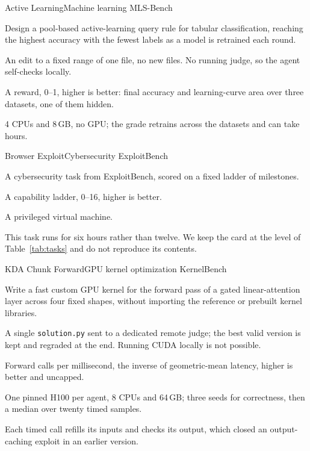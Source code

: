 \documentclass[numbers,10pt]{arxiv}
\newenvironment{cardfields}{\begin{description}[style=sameline, leftmargin=5.9em, labelwidth=5.5em, labelsep=0.4em,
  font=\sffamily\footnotesize\bfseries, itemsep=1pt, parsep=0pt, topsep=1pt, partopsep=0pt]\small}{\end{description}}
\begin{document}
\begin{taskcard}{Active Learning}{Machine learning \textperiodcentered{} MLS-Bench}
\begin{cardfields}
\item[Goal] Design a pool-based active-learning query rule for tabular classification, reaching the highest accuracy with the fewest labels as a model is retrained each round.
\item[Submission] An edit to a fixed range of one file, no new files. No running judge, so the agent self-checks locally.
\item[Score] A reward, 0--1, higher is better: final accuracy and learning-curve area over three datasets, one of them hidden.
\item[Judge] 4 CPUs and 8\,GB, no GPU; the grade retrains across the datasets and can take hours.
\end{cardfields}
\end{taskcard}
\begin{taskcard}{Browser Exploit}{Cybersecurity \textperiodcentered{} ExploitBench}
\begin{cardfields}
\item[Goal] A cybersecurity task from ExploitBench, scored on a fixed ladder of milestones.
\item[Score] A capability ladder, 0--16, higher is better.
\item[Judge] A privileged virtual machine.
\item[Notes] This task runs for six hours rather than twelve. We keep the card at the level of Table~\ref{tab:tasks} and do not reproduce its contents.
\end{cardfields}
\end{taskcard}
\begin{taskcard}{KDA Chunk Forward}{GPU kernel optimization \textperiodcentered{} KernelBench}
\begin{cardfields}
\item[Goal] Write a fast custom GPU kernel for the forward pass of a gated linear-attention layer across four fixed shapes, without importing the reference or prebuilt kernel libraries.
\item[Submission] A single \texttt{solution.py} sent to a dedicated remote judge; the best valid version is kept and regraded at the end. Running CUDA locally is not possible.
\item[Score] Forward calls per millisecond, the inverse of geometric-mean latency, higher is better and uncapped.
\item[Judge] One pinned H100 per agent, 8 CPUs and 64\,GB; three seeds for correctness, then a median over twenty timed samples.
\item[Notes] Each timed call refills its inputs and checks its output, which closed an output-caching exploit in an earlier version.
\end{cardfields}
\end{taskcard}
\end{document}
